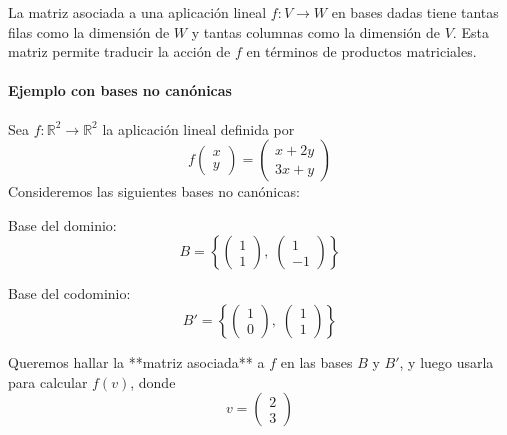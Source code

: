 \begin{tcolorbox}
La matriz asociada a una aplicación lineal \(f: V \to W\) en bases dadas tiene tantas filas como la dimensión de \(W\) y tantas columnas como la dimensión de \(V\). Esta matriz permite traducir la acción de \(f\) en términos de productos matriciales.
\end{tcolorbox}

\paragraph{Ejemplo con bases no canónicas}

\begin{ejemplo}
Sea \(f: \mathbb{R}^2 \to \mathbb{R}^2\) la aplicación lineal definida por
\[
f\begin{pmatrix}x \\ y\end{pmatrix} = \begin{pmatrix}x + 2y \\ 3x + y\end{pmatrix}
\]
Consideremos las siguientes bases no canónicas:

Base del dominio:
\[
B = \left\{ \begin{pmatrix}1 \\ 1\end{pmatrix},\; \begin{pmatrix}1 \\ -1\end{pmatrix} \right\}
\]

Base del codominio:
\[
B' = \left\{ \begin{pmatrix}1 \\ 0\end{pmatrix},\; \begin{pmatrix}1 \\ 1\end{pmatrix} \right\}
\]

Queremos hallar la **matriz asociada** a \(f\) en las bases \(B\) y \(B'\), y luego usarla para calcular \(f(v)\), donde
\[
v = \begin{pmatrix}2 \\ 3\end{pmatrix}
\]


\end{ejemplo}
